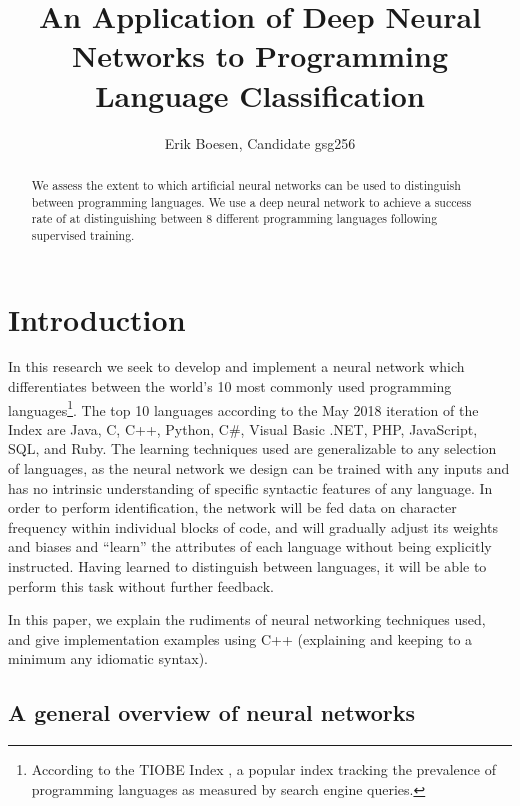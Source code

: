 \documentclass{article}
\begin{document}
\title{An Application of Deep Neural Networks to Programming Language Classification}
\author{Erik Boesen, Candidate gsg256}
\maketitle

\begin{abstract}
We assess the extent to which artificial neural networks can be used to distinguish between programming languages. We use a deep neural network to achieve a success rate of  at distinguishing between 8 different programming languages following supervised training.
\end{abstract}

\section{Introduction}
In this research we seek to develop and implement a neural network which differentiates between the world's 10 most commonly used programming languages\footnote{According to the TIOBE Index \cite{tiobe}, a popular index tracking the prevalence of programming languages as measured by search engine queries.}. The top 10 languages according to the May 2018 iteration of the Index are Java, C, C++, Python, C\#, Visual Basic .NET, PHP, JavaScript, SQL, and Ruby. The learning techniques used are generalizable to any selection of languages, as the neural network we design can be trained with any inputs and has no intrinsic understanding of specific syntactic features of any language. In order to perform identification, the network will be fed data on character frequency within individual blocks of code, and will gradually adjust its weights and biases and ``learn'' the attributes of each language without being explicitly instructed. Having learned to distinguish between languages, it will be able to perform this task without further feedback.

In this paper, we explain the rudiments of neural networking techniques used, and give implementation examples using C++ (explaining and keeping to a minimum any idiomatic syntax).

\subsection{A general overview of neural networks}
\end{document}
